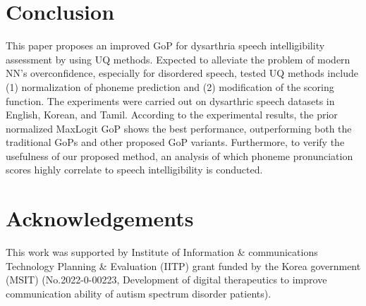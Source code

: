 \section{Conclusion} \label{sec:conclusion}
This paper proposes an improved GoP for dysarthria speech intelligibility assessment by using UQ methods.
Expected to alleviate the problem of modern NN's overconfidence, especially for disordered speech, tested UQ methods include (1) normalization of phoneme prediction and (2) modification of the scoring function. 
The experiments were carried out on dysarthric speech datasets in English, Korean, and Tamil.
According to the experimental results, the prior normalized MaxLogit GoP shows the best performance, outperforming both the traditional GoPs and other proposed GoP variants.
Furthermore, to verify the usefulness of our proposed method, an analysis of which phoneme pronunciation scores highly correlate to speech intelligibility is conducted.


\section{Acknowledgements}
This work was supported by Institute of Information \& communications Technology Planning \& Evaluation (IITP) grant funded by the Korea government (MSIT) (No.2022-0-00223, Development of digital therapeutics to improve communication ability of autism spectrum disorder patients).







